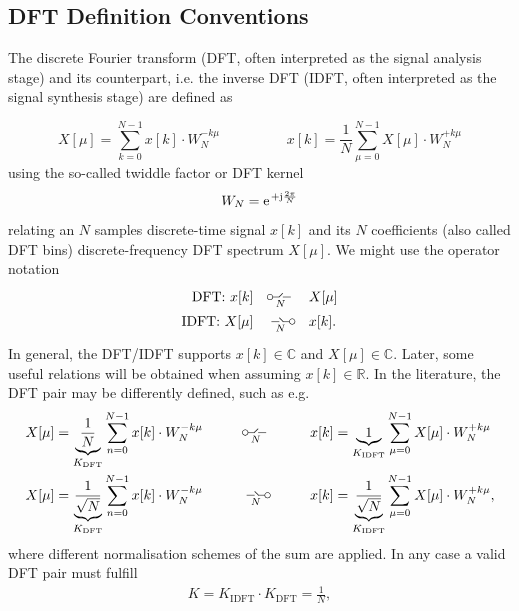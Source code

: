 \documentclass[11pt,a4paper,DIV=12]{scrartcl}
\newcommand{\mydft}{\mbox{\setlength{\unitlength}{0.1em}%
                            \begin{picture}(20,10)%
                              \put(2,3){\circle{4}}%
                              \put(4,3){\line(1,0){4.75}}%
                              \multiput(8.625,3.15)(0.25,0.25){11}{%
                                \makebox(0,0){\rmfamily\tiny .}}%
                              \put(17,3){\line(-1,0){5.75}}%
                              \put(6,-4){\scriptsize $N$}
                            \end{picture}%
                           }
                      }
\newcommand{\myDFT}{\mbox{\setlength{\unitlength}{0.1em}%
                            \begin{picture}(20,10)%
                              \put(3,3){\line(1,0){5.75}}%
                              \multiput(11.375,3.15)(-0.25,0.25){11}{%
                                \makebox(0,0){\rmfamily\tiny .}}%
                              \put(16,3){\line(-1,0){4.75}}%
                              \put(18,3){\circle{4}}%
                              \put(6,-4){\scriptsize $N$}
                            \end{picture}%
                           }
                      }
\begin{document}
\subsection{DFT Definition Conventions}
The discrete Fourier transform (DFT, often interpreted as the signal analysis
stage) and
its counterpart, i.e. the inverse DFT (IDFT, often interpreted as the signal
synthesis stage)
are defined as
\begin{framed}
%
\begin{equation}
X[\mu]=\sum_{k=0}^{N-1}x[k]\cdot W_N^{-k\mu} \hspace{2cm}
x[k]=\frac{1}{N}\sum_{\mu=0}^{N-1}X[\mu]\cdot W_N^{+k\mu}
\end{equation}
using the so-called twiddle factor or DFT kernel
\begin{equation}
W_N=\e^{+\im\frac{2\pi}{N}}
\end{equation}
%
relating an $N$ samples discrete-time signal $x[k]$ and its $N$ coefficients
(also called DFT bins) discrete-frequency DFT spectrum $X[\mu]$.
%
We might use the operator notation
\begin{align}
\text{DFT: }x[k] &\quad\mydft\quad X[\mu]\\
\text{IDFT: }X[\mu] &\quad\myDFT\quad x[k].
\end{align}
%
\end{framed}
%
In general, the DFT/IDFT supports $x[k]\in \mathbb{C}$ and
$X[\mu]\in \mathbb{C}$.
%
Later, some useful relations will be obtained when assuming
$x[k]\in\mathbb{R}$.
%
In the literature, the DFT pair may be differently defined, such as e.g.
\begin{align}
&X[\mu]=\underbrace{{\frac{1}{N}}}_{K_\text{DFT}}\sum_{n=0}^{N-1}x[k]\cdot W_N^{-k\mu}
\hspace{1cm}\mydft\hspace{1cm}
x[k]=\underbrace{{1}}_{K_\text{IDFT}}\sum_{\mu=0}^{N-1}X[\mu]\cdot W_N^{+k\mu}\\
&X[\mu]=\underbrace{{\frac{1}{\sqrt{N}}}}_{K_\text{DFT}}\sum_{n=0}^{N-1}x[k]\cdot W_N^{-k\mu}
\hspace{1cm}\myDFT\hspace{1cm}
x[k]=\underbrace{{\frac{1}{\sqrt{N}}}}_{K_\text{IDFT}}\sum_{\mu=0}^{N-1}X[\mu]\cdot W_N^{+k\mu},
\label{eq:orthonorm}
\end{align}
where different normalisation schemes of the sum are applied.
%
In any case a valid DFT pair must fulfill
\begin{align}
K=K_{\text{IDFT}}\cdot K_{\text{DFT}}=\frac{1}{N},
\end{align}
\end{document}

